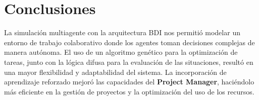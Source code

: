\documentclass[a4paper, 12pt]{article}
\begin{document}
\section{Conclusiones}
La simulación multiagente con la arquitectura BDI nos permitió modelar un entorno de trabajo colaborativo donde los agentes toman decisiones complejas de manera autónoma. El uso de un algoritmo genético para la optimización de tareas, junto con la lógica difusa para la evaluación de las situaciones, resultó en una mayor flexibilidad y adaptabilidad del sistema. La incorporación de aprendizaje reforzado mejoró las capacidades del \textbf{Project Manager}, haciéndolo más eficiente en la gestión de proyectos y la optimización del uso de los recursos.
\end{document}
